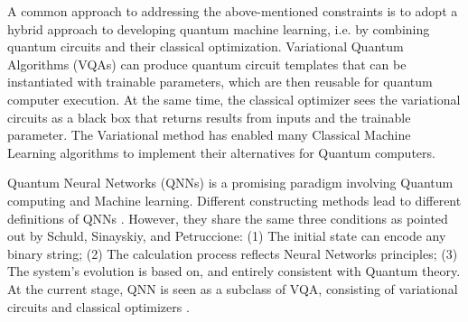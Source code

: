 A common approach to addressing the above-mentioned constraints is to adopt a hybrid approach to developing quantum machine learning, i.e. by combining quantum circuits and their classical optimization. 
Variational Quantum Algorithms (VQAs) \cite{cerezo2021variational} can produce quantum circuit templates that can be instantiated with trainable parameters, which are then reusable for quantum computer execution. 
At the same time, the classical optimizer sees the variational circuits as a black box that returns results from inputs and the trainable parameter. 
The Variational method has enabled many Classical Machine Learning algorithms to implement their alternatives for Quantum computers.

Quantum Neural Networks (QNNs) \cite{altaisky2001quantum} is a promising paradigm involving Quantum computing and Machine learning. 
Different constructing methods lead to different definitions of QNNs \cite{paetznick2013} \cite{zhaoBuildingQuantumNeural2019} \cite{caoQuantumNeuronElementary2017}. 
However, they share the same three conditions as pointed out by \cite{schuldQuestQuantumNeural2014} Schuld, Sinayskiy, and Petruccione: 
(1) The initial state can encode any binary string;
(2) The calculation process reflects Neural Networks principles;
(3) The system's evolution is based on, and entirely consistent with Quantum theory.
At the current stage, QNN is seen as a subclass of VQA, consisting of variational circuits and classical optimizers \cite{abbasPowerQuantumNeural2021}.

